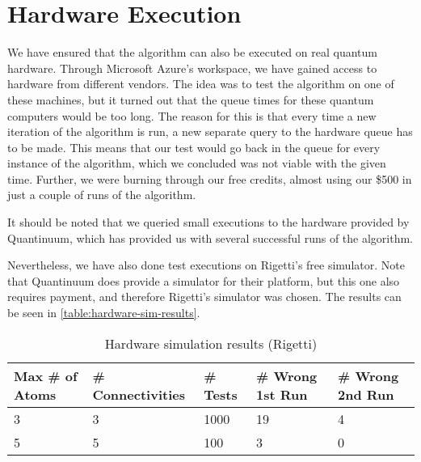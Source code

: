 \section{Hardware Execution}\label{sec:hardware-execution}
We have ensured that the algorithm can also be executed on real quantum hardware.
Through Microsoft Azure's workspace, we have gained access to hardware from different vendors.
The idea was to test the algorithm on one of these machines, but it turned out that the queue times for these quantum computers would be too long.
The reason for this is that every time a new iteration of the algorithm is run, a new separate query to the hardware queue has to be made.
This means that our test would go back in the queue for every instance of the algorithm, which we concluded was not viable with the given time.
Further, we were burning through our free credits, almost using our \$500 in just a couple of runs of the algorithm.

It should be noted that we queried small executions to the hardware provided by Quantinuum, which has provided us with several successful runs of the algorithm.

Nevertheless, we have also done test executions on Rigetti's free simulator.
Note that Quantinuum does provide a simulator for their platform, but this one also requires payment, and therefore Rigetti's simulator was chosen.
The results can be seen in \autoref{table:hardware-sim-results}.

\begin{table}[h!]
\centering
\begin{tabularx}{\textwidth}{|X|X|X|X|X|}
\hline
Max \# of Atoms & \# Connectivities & \# Tests &  \# Wrong 1st Run & \# Wrong 2nd Run \\
\hline
3 & 3 & 1000 & 19 & 4 \\
5 & 5 &  100 &  3 & 0 \\
\hline
\end{tabularx}
\caption{Hardware simulation results (Rigetti)}
\label{table:hardware-sim-results}
\end{table}
